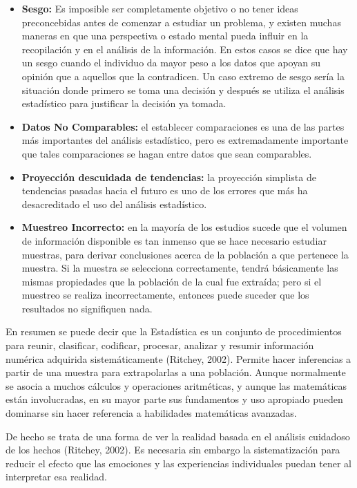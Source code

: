 \begin{itemize}
    \item \textbf{Sesgo:} Es imposible ser completamente objetivo o no tener ideas preconcebidas antes de comenzar a estudiar un problema, y existen muchas maneras en que una perspectiva o estado mental pueda influir en la recopilaci\'on y en el an\'alisis de la informaci\'on. En estos casos se dice que hay un sesgo cuando el individuo da mayor peso a los datos que apoyan su opini\'on que a aquellos que la contradicen. Un caso extremo de sesgo ser\'ia la situaci\'on donde primero se toma una decisi\'on y despu\'es se utiliza el an\'alisis estad\'istico para justificar la decisi\'on ya tomada.
    \item \textbf{Datos No Comparables:} el establecer comparaciones es una de las partes m\'as importantes del an\'alisis estad\'istico, pero es extremadamente importante que tales comparaciones se hagan entre datos que sean comparables.
    \item \textbf{Proyecci\'on descuidada de tendencias:} la proyecci\'on simplista de tendencias pasadas hacia el futuro es uno de los errores que m\'as ha desacreditado el uso del an\'alisis estad\'istico.
    \item \textbf{Muestreo Incorrecto:} en la mayor\'ia de los estudios sucede que el volumen de informaci\'on disponible es tan inmenso que se hace necesario estudiar muestras, para derivar conclusiones acerca de la poblaci\'on a que pertenece la muestra. Si la muestra se selecciona correctamente, tendr\'a b\'asicamente las mismas propiedades que la poblaci\'on de la cual fue extra\'ida; pero si el muestreo se realiza incorrectamente, entonces puede suceder que los resultados no signifiquen nada.
\end{itemize}

En resumen se puede decir que la Estad\'istica es un conjunto de procedimientos para reunir, clasificar, codificar, procesar, analizar y resumir informaci\'on num\'erica adquirida sistem\'aticamente (Ritchey, 2002). Permite hacer inferencias a partir de una muestra para extrapolarlas a una poblaci\'on. Aunque normalmente se asocia a muchos c\'alculos y operaciones aritm\'eticas, y aunque las matem\'aticas est\'an involucradas, en su mayor parte sus fundamentos y uso apropiado pueden dominarse sin hacer referencia a habilidades matem\'aticas avanzadas. 

De hecho se trata de una forma de ver la realidad basada en el an\'alisis cuidadoso de los hechos (Ritchey, 2002). Es necesaria sin embargo la sistematizaci\'on para reducir el efecto que las emociones y las experiencias individuales puedan tener al interpretar esa realidad.

